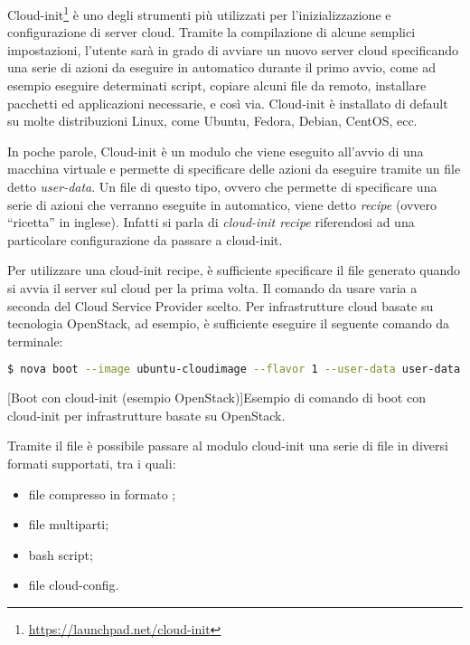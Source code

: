             Cloud-init\footnote{\url{https://launchpad.net/cloud-init}} è uno degli strumenti più utilizzati per l'inizializzazione e configurazione di server cloud. Tramite la compilazione di alcune semplici impostazioni, l'utente sarà in grado di avviare un nuovo server cloud specificando una serie di azioni da eseguire in automatico durante il primo avvio, come ad esempio eseguire determinati script, copiare alcuni file da remoto, installare pacchetti ed applicazioni necessarie, e così via. Cloud-init è installato di default su molte distribuzioni Linux, come Ubuntu, Fedora, Debian, CentOS, ecc. \cite{cloud-init:readthedocs}
            
            In poche parole, Cloud-init è un modulo che viene eseguito all'avvio di una macchina virtuale e permette di specificare delle azioni da eseguire tramite un file detto \textit{user-data}. Un file di questo tipo, ovvero che permette di specificare una serie di azioni che verranno eseguite in automatico, viene detto \textit{recipe} (ovvero ``ricetta'' in inglese). Infatti si parla di \textit{cloud-init recipe} riferendosi ad una particolare configurazione da passare a cloud-init.
            
            Per utilizzare una cloud-init recipe, è sufficiente specificare il file  generato quando si avvia il server sul cloud per la prima volta. Il comando da usare varia a seconda del Cloud Service Provider scelto. Per infrastrutture cloud basate su tecnologia OpenStack, ad esempio, è sufficiente eseguire il seguente comando da terminale:
            
            \begin{center}
                \begin{lstlisting}[language=bash, gobble=18]
                    $ nova boot --image ubuntu-cloudimage --flavor 1 --user-data user-data
                \end{lstlisting}
                \captionsetup{textformat=empty,labelformat=empty} \vspace{-2em}
                [Boot con cloud-init (esempio OpenStack)]{Esempio di comando di boot con cloud-init per infrastrutture basate su OpenStack.}
            \end{center}
            
            Tramite il file  è possibile passare al modulo cloud-init una serie di file in diversi formati supportati, tra i quali:
            
            \begin{itemize}
                \item file compresso in formato ;
                \item file  multiparti;
                \item bash script;
                \item file cloud-config.
            \end{itemize}
            
